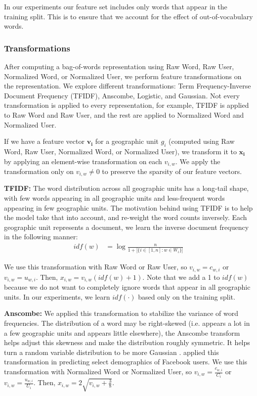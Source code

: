 \documentclass[letterpaper]{article}
\begin{document}
In our experiments our feature set includes only words that appear in the training split. This is to ensure that we account for the effect of out-of-vocabulary words.

\subsubsection{Transformations} After computing a bag-of-words representation using Raw Word, Raw User, Normalized Word, or Normalized User, we perform feature transformations on the representation. We explore different transformations: Term Frequency-Inverse Document Frequency (TFIDF), Anscombe, Logistic, and Gaussian. Not every transformation is applied to every representation, for example, TFIDF is applied to Raw Word and Raw User, and the rest are applied to Normalized Word and Normalized User. 

If we have a feature vector $\mathbf{v_i}$ for a geographic unit $g_i$ (computed using Raw Word, Raw User, Normalized Word, or Normalized User), we transform it to $\mathbf{x_i}$ by applying an element-wise transformation on each $v_{i,w}$. We apply the transformation only on $v_{i,w}\neq0$ to preserve the sparsity of our feature vectors.

\textbf{TFIDF:} The word distribution across all geographic units has a long-tail shape, with few words appearing in all geographic units and less-frequent words appearing in few geographic units. The motivation behind using TFIDF is to help the model take that into account, and re-weight the word counts inversely. Each geographic unit represents a document, we learn the inverse document frequency in the following manner:
\begin{align*}
    idf(w) &= \log \frac{n}{1 + |\{i \in [1,n]: w \in W_i\}|}
\end{align*}

We use this transformation with Raw Word or Raw User, so $v_{i,w} = c_{w,i}$ or $v_{i,w} = u_{w,i}$. Then, $x_{i,w} = v_{i,w}( idf(w) + 1 )$. Note that we add a 1 to $idf(w)$ because we do not want to completely ignore words that appear in all geographic units. In our experiments, we learn $idf(\cdot)$ based only on the training split. 

\textbf{Anscombe:} We applied this transformation to stabilize the variance of word frequencies. The distribution of a word may be right-skewed (i.e. appears a lot in a few geographic units and appears little elsewhere), the Anscombe transform helps adjust this skewness and make the distribution roughly symmetric. It helps turn a random variable distribution to be more Gaussian \cite{anscombe1948transformation}. \citeauthor{schwartz2013personality}  applied this transformation in predicting select demographics of Facebook users. We use this transformation with Normalized Word or Normalized User, so $v_{i,w} = \frac{c_{w,i}}{C_i}$ or $v_{i,w} = \frac{u_{w,i}}{U_i}$. Then, $x_{i,w} = 2\sqrt{v_{i,w} + \frac{3}{8}} $.
\end{document}

